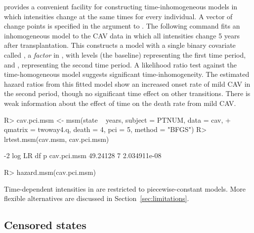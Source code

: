 \documentclass[article,shortnames]{jss}
\begin{document}
 provides a convenient facility for constructing
time-inhomogeneous models in which intensities change at the same
times for every individual.  A vector of change points is specified in
the  argument to .  The following command fits
an inhomogeneous model to the CAV data in which all intensities change
5 years after transplantation.  This constructs a model with a single
binary covariate called , a \emph{factor} in
, with levels \code{(-Inf, 5]} (the baseline) representing
the first time period, and \code{[5, Inf)}, representing the second
time period.  A likelihood ratio test against the time-homogeneous
model suggests significant time-inhomogeneity.  The estimated hazard
ratios from this fitted model show an increased onset rate of mild CAV
in the second period, though no significant time effect on other
transitions.  There is weak information about the effect of time on
the death rate from mild CAV.

\begin{CodeChunk}
  \begin{CodeInput}
R> cav.pci.msm <- msm(state ~ years, subject = PTNUM, data = cav,
+    qmatrix = twoway4.q, death = 4, pci = 5, method = "BFGS")
R> lrtest.msm(cav.msm, cav.pci.msm)
  \end{CodeInput}
  \begin{CodeOutput}
            -2 log LR df            p
cav.pci.msm  49.24128  7 2.034911e-08
  \end{CodeOutput}
  \begin{CodeInput}
R> hazard.msm(cav.pci.msm)
  \end{CodeInput}
  \begin{CodeOutput}
$`timeperiod[5,Inf)`
                       HR         L           U
Well - Mild     2.2080439 1.6418440    2.969501
Well - Death    0.6714820 0.2472622    1.823522
Mild - Well     0.6634596 0.3581871    1.228907
Mild - Severe   0.9165669 0.5747890    1.461571
Mild - Death   12.9314664 0.1392106 1201.221729
Severe - Mild   1.4253788 0.4753785    4.273867
Severe - Death  1.6828792 0.8470715    3.343381
  \end{CodeOutput}
\end{CodeChunk}

Time-dependent intensities in  are restricted to
piecewise-constant models.  More flexible alternatives are discussed
in Section~\ref{sec:limitations}.

\subsection{Censored states}
\label{sec:censoring}
\end{document}
